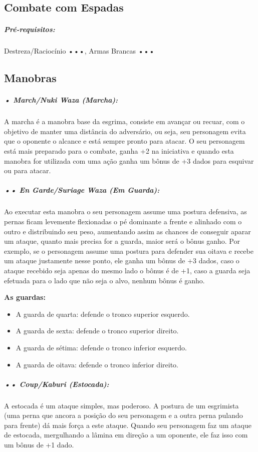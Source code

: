 
\subsection{\bf Combate com Espadas}

\subparagraph*{\bf Pré-requisitos:} Destreza/Raciocínio •••, Armas Brancas •••

\subsection{\bf Manobras}

\subparagraph{\bf • March/Nuki Waza (Marcha):} 
A marcha é a manobra base da esgrima, consiste em avançar ou recuar, com o objetivo de manter uma distância do adversário, ou seja, seu personagem evita que o oponente o alcance e está sempre pronto para atacar. O seu personagem está mais preparado para o combate, ganha +2 na iniciativa e quando esta manobra for utilizada com uma ação ganha um bônus de +3 dados para esquivar ou para atacar.

\subparagraph{\bf •• En Garde/Suriage Waza (Em Guarda):} 
Ao executar esta manobra o seu personagem assume uma postura defensiva, as pernas ficam levemente flexionadas o pé dominante a frente e alinhado com o outro e distribuindo seu peso, aumentando assim as chances de conseguir aparar um ataque, quanto mais precisa for a guarda, maior será o bônus ganho. Por exemplo, se o personagem assume uma postura para defender sua oitava e recebe um ataque justamente nesse ponto, ele ganha um bônus de +3 dados, caso o ataque recebido seja apenas do mesmo lado o bônus é de +1, caso a guarda seja efetuada para o lado que não seja o alvo, nenhum bônus é ganho.

{\bf As guardas:}
\begin{itemize}[noitemsep]
\item A guarda de quarta: defende o tronco superior esquerdo.
\item A guarda de sexta: defende o tronco superior direito.
\item A guarda de sétima: defende o tronco inferior esquerdo.
\item A guarda de oitava: defende o tronco inferior direito.
\end{itemize}

\subparagraph{\bf •• Coup/Kaburi (Estocada):} 
A estocada é um ataque simples, mas poderoso. A postura de um esgrimista (uma perna que ancora a posição do seu personagem e a outra perna pulando para frente) dá mais força a este ataque. Quando seu personagem faz um ataque de estocada, mergulhando a lâmina em direção a um oponente, ele faz isso com um bônus de +1 dado.

